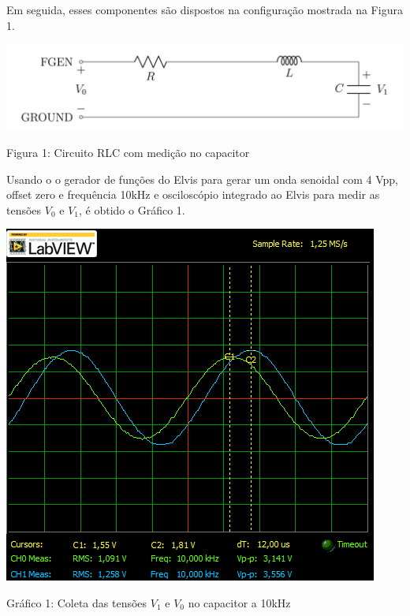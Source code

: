 \documentclass[a4 paper]{article}
\begin{document}


Em seguida, esses componentes são dispostos na configuração mostrada na Figura 1.

\begin{table}[h]
\centering
\includegraphics[scale=0.5]{figuras/circuito1}
\end{table}

\begin{center}
Figura 1: Circuito RLC com medição no capacitor
\end{center}

Usando o o gerador de funções do Elvis para gerar um onda senoidal com 4 Vpp, offset zero e frequência 10kHz e osciloscópio integrado ao Elvis para medir as tensões $V_0$ e $V_1$, é obtido o Gráfico 1.


\begin{table}[h]
\centering
\includegraphics[scale=0.7]{graficos/circ1/rgadicoa1-2-10}
\end{table}

\begin{center}
Gráfico 1: Coleta das tensões $V_1$ e $V_0$ no capacitor a 10kHz
\end{center}
\end{document}
